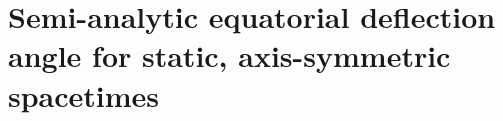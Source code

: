 \section{Semi-analytic equatorial deflection angle for static, axis-symmetric spacetimes}
\label{appendix:deflection-angle}

